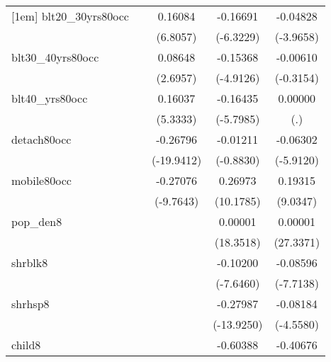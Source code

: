 \documentclass{article}
\begin{document}
{\begin{longtable}{l*{4}{c}}
[1em]
blt20\_30yrs80occ    &                     &     0.16084\sym{***}&    -0.16691\sym{***}&    -0.04828\sym{***}\\
                    &                     &    (6.8057)         &   (-6.3229)         &   (-3.9658)         \\
[1em]
blt30\_40yrs80occ    &                     &     0.08648\sym{**} &    -0.15368\sym{***}&    -0.00610         \\
                    &                     &    (2.6957)         &   (-4.9126)         &   (-0.3154)         \\
[1em]
blt40\_yrs80occ      &                     &     0.16037\sym{***}&    -0.16435\sym{***}&     0.00000         \\
                    &                     &    (5.3333)         &   (-5.7985)         &         (.)         \\
[1em]
detach80occ         &                     &    -0.26796\sym{***}&    -0.01211         &    -0.06302\sym{***}\\
                    &                     &  (-19.9412)         &   (-0.8830)         &   (-5.9120)         \\
[1em]
mobile80occ         &                     &    -0.27076\sym{***}&     0.26973\sym{***}&     0.19315\sym{***}\\
                    &                     &   (-9.7643)         &   (10.1785)         &    (9.0347)         \\
[1em]
pop\_den8            &                     &                     &     0.00001\sym{***}&     0.00001\sym{***}\\
                    &                     &                     &   (18.3518)         &   (27.3371)         \\
[1em]
shrblk8             &                     &                     &    -0.10200\sym{***}&    -0.08596\sym{***}\\
                    &                     &                     &   (-7.6460)         &   (-7.7138)         \\
[1em]
shrhsp8             &                     &                     &    -0.27987\sym{***}&    -0.08184\sym{***}\\
                    &                     &                     &  (-13.9250)         &   (-4.5580)         \\
[1em]
child8              &                     &                     &    -0.60388\sym{***}&    -0.40676\sym{***}\\

\end{longtable}}
\end{document}

